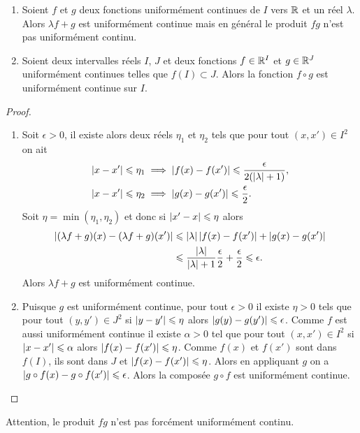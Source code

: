 \begin{prop}
  \begin{enumerate}
  \item Soient \(f\) et \(g\) deux fonctions uniformément continues de \(I\) vers \(\mathbb{R}\) et un réel \(\lambda\). Alors \(\lambda f +g\) est uniformément continue mais en général le produit \(fg\) n'est pas uniformément continu.
  \item Soient deux intervalles réels \(I\), \(J\) et deux fonctions \(f \in \mathbb{R}^I\) et \(g\in \mathbb{R}^J\) uniformément continues telles que \(f(I)\subset J\). Alors la fonction \(f \circ g\) est uniformément continue sur \(I\).
  \end{enumerate}
\end{prop}
\begin{proof}
  \begin{enumerate}
  \item Soit \(\epsilon >0\), il existe alors deux réels \(\eta_1\) et \(\eta_2\) tels que pour tout \((x,x') \in I^2\) on ait
    \begin{align}
      \left\lvert x-x'\right\rvert \leqslant \eta_1 &\implies \left\lvert f(x)-f(x')\right\rvert \leqslant \frac{\epsilon}{2(\left\lvert\lambda\right\rvert+1)},\\
      \left\lvert x-x'\right\rvert \leqslant \eta_2 &\implies \left\lvert g(x)-g(x')\right\rvert \leqslant \frac{\epsilon}{2}.
    \end{align}
    Soit \(\eta=\min(\eta_1,\eta_2)\) et donc si \(\left\lvert x'-x\right\rvert \leqslant \eta\) alors 
    \begin{align}
      \left\lvert(\lambda f+g)(x)-(\lambda f+g)(x')\right\rvert &\leqslant \left\lvert\lambda\right\rvert \left\lvert f(x)-f(x')\right\rvert + \left\lvert g(x)-g(x')\right\rvert \\
      &\leqslant \frac{\left\lvert\lambda\right\rvert}{\left\lvert\lambda\right\rvert +1} \frac{\epsilon}{2}+\frac{\epsilon}{2} \leqslant \epsilon.
    \end{align}
    Alors \(\lambda f+g\) est uniformément continue.
  \item Puisque \(g\) est uniformément continue, pour tout \(\epsilon >0\) il existe \(\eta >0\) tels que pour tout \((y,y') \in J^2\) si \(\left\lvert y-y'\right\rvert \leqslant \eta\) alors \(\left\lvert g(y)-g(y')\right\rvert \leqslant \epsilon\). Comme \(f\) est aussi uniformément continue il existe \(\alpha >0\) tel que pour tout \((x,x') \in I^2\) si \(\left\lvert x-x'\right\rvert \leqslant \alpha\) alors \(\left\lvert f(x)-f(x')\right\rvert \leqslant \eta\). Comme \(f(x)\) et \(f(x')\) sont dans \(f(I)\), ils sont dans \(J\) et \(\left\lvert f(x)-f(x')\right\rvert \leqslant \eta\). Alors en appliquant \(g\) on a \(\left\lvert g \circ f(x)-g \circ f(x')\right\rvert \leqslant \epsilon\). Alors la composée \(g \circ f\) est uniformément continue.
  \end{enumerate}
\end{proof}
Attention, le produit \(fg\) n'est pas forcément uniformément continu.

